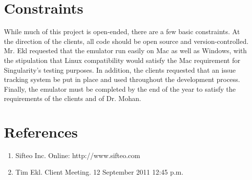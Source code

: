 \documentclass[12pt]{article}
\begin{document}
\section{Constraints}
        While much of this project is open-ended, there are a few basic constraints. At the direction of the clients, all code should be open source and version-controlled. Mr. Ekl requested that the emulator run easily on Mac as well as Windows, with the stipulation that Linux compatibility would satisfy the Mac requirement for Singularity's testing purposes. In addition, the clients requested that an issue tracking system be put in place and used throughout the development process. Finally, the emulator must be completed by the end of the year to satisfy the requirements of the clients and of Dr. Mohan.

\clearpage
\printglossaries
\clearpage

\section*{References}

        \begin{enumerate}
                \item{Sifteo Inc. Online: http://www.sifteo.com}
                \item{Tim Ekl.  Client Meeting.  12 September 2011 12:45 p.m.}
        \end{enumerate}

\printindex
\end{document}
